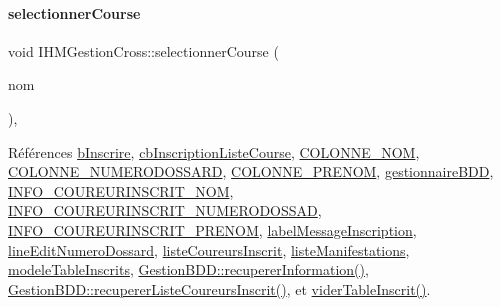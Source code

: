 \mbox{\label{class_i_h_m_gestion_cross_ae555b32462455a2cdaf0f8dc2e016d14}} 
\paragraph{\texorpdfstring{selectionner\+Course}{selectionnerCourse}}
{\footnotesize\ttfamily void I\+H\+M\+Gestion\+Cross\+::selectionner\+Course (\begin{DoxyParamCaption}\item[{Q\+String}]{nom }\end{DoxyParamCaption})\hspace{0.3cm}{\ttfamily [private]}, {\ttfamily [slot]}}



Références \hyperlink{class_i_h_m_gestion_cross_a1afbc04ebd42deafebbbdc998d0fc246}{b\+Inscrire}, \hyperlink{class_i_h_m_gestion_cross_aff44e6f1a225ee5b55783afe72049f83}{cb\+Inscription\+Liste\+Course}, \hyperlink{ihmchronocross_8h_aeee76385895c145ef5a633e6c6812603}{C\+O\+L\+O\+N\+N\+E\+\_\+\+N\+OM}, \hyperlink{ihmgestioncross_8h_a20d627e7b24ae715fda576e69408ae3f}{C\+O\+L\+O\+N\+N\+E\+\_\+\+N\+U\+M\+E\+R\+O\+D\+O\+S\+S\+A\+RD}, \hyperlink{ihmchronocross_8h_a5d6f240d26209cd66db8aa5e1aac62f9}{C\+O\+L\+O\+N\+N\+E\+\_\+\+P\+R\+E\+N\+OM}, \hyperlink{class_i_h_m_gestion_cross_a440bac63a3e51db3e2c08e883f8cafc9}{gestionnaire\+B\+DD}, \hyperlink{ihmgestioncross_8h_aa5b4e42123269ad7f574258d5bbb9cda}{I\+N\+F\+O\+\_\+\+C\+O\+U\+R\+E\+U\+R\+I\+N\+S\+C\+R\+I\+T\+\_\+\+N\+OM}, \hyperlink{ihmgestioncross_8h_a460662db33a6d68eead7d488ee61a76c}{I\+N\+F\+O\+\_\+\+C\+O\+U\+R\+E\+U\+R\+I\+N\+S\+C\+R\+I\+T\+\_\+\+N\+U\+M\+E\+R\+O\+D\+O\+S\+S\+AD}, \hyperlink{ihmgestioncross_8h_a73a7d4efe208177f86cc761b0d5fd089}{I\+N\+F\+O\+\_\+\+C\+O\+U\+R\+E\+U\+R\+I\+N\+S\+C\+R\+I\+T\+\_\+\+P\+R\+E\+N\+OM}, \hyperlink{class_i_h_m_gestion_cross_a1855bd63290c39c20660064b41710e8c}{label\+Message\+Inscription}, \hyperlink{class_i_h_m_gestion_cross_adeb4cfc9a218c06fca5cabc280a611e2}{line\+Edit\+Numero\+Dossard}, \hyperlink{class_i_h_m_gestion_cross_a6b7c699caf9ae80c89f4cf5c58ae93d6}{liste\+Coureurs\+Inscrit}, \hyperlink{class_i_h_m_gestion_cross_ac42ca910fa9802b3f63e3393aaa14e8a}{liste\+Manifestations}, \hyperlink{class_i_h_m_gestion_cross_a19565551280115e642ceb9790c7317bc}{modele\+Table\+Inscrits}, \hyperlink{class_gestion_b_d_d_a0a2fa02b90974684658937fbfb55bf0a}{Gestion\+B\+D\+D\+::recuperer\+Information()}, \hyperlink{class_gestion_b_d_d_a09b547cb065256acd269c64e273c93fd}{Gestion\+B\+D\+D\+::recuperer\+Liste\+Coureurs\+Inscrit()}, et \hyperlink{class_i_h_m_gestion_cross_ac1ca02b1cb49d9c2f60785c8bd441d60}{vider\+Table\+Inscrit()}.



